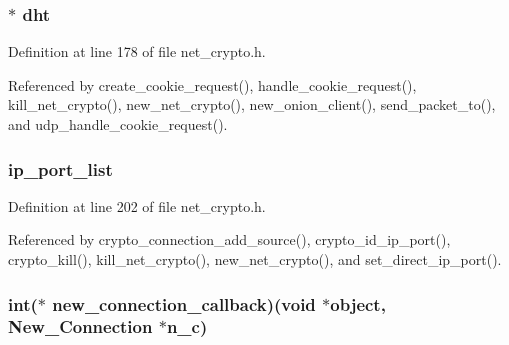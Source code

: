 \hypertarget{struct_net___crypto_a8b3d6ce8745acc52695e252bdb1531b6}{
\subsubsection[{dht}]{$\ast$ dht}}\label{struct_net___crypto_a8b3d6ce8745acc52695e252bdb1531b6}


Definition at line 178 of file net\+\_\+crypto.\+h.



Referenced by create\+\_\+cookie\+\_\+request(), handle\+\_\+cookie\+\_\+request(), kill\+\_\+net\+\_\+crypto(), new\+\_\+net\+\_\+crypto(), new\+\_\+onion\+\_\+client(), send\+\_\+packet\+\_\+to(), and udp\+\_\+handle\+\_\+cookie\+\_\+request().

\hypertarget{struct_net___crypto_ae8cfe94df9c9030bbc525010603450ac}{
\subsubsection[{ip\+\_\+port\+\_\+list}]{ ip\+\_\+port\+\_\+list}}\label{struct_net___crypto_ae8cfe94df9c9030bbc525010603450ac}


Definition at line 202 of file net\+\_\+crypto.\+h.



Referenced by crypto\+\_\+connection\+\_\+add\+\_\+source(), crypto\+\_\+id\+\_\+ip\+\_\+port(), crypto\+\_\+kill(), kill\+\_\+net\+\_\+crypto(), new\+\_\+net\+\_\+crypto(), and set\+\_\+direct\+\_\+ip\+\_\+port().

\hypertarget{struct_net___crypto_a4e2c131b4a4b4ccb2acc140c29c628be}{
\subsubsection[{new\+\_\+connection\+\_\+callback}]{\setlength{\rightskip}{0pt plus 5cm}int($\ast$ new\+\_\+connection\+\_\+callback)(void $\ast$object, {\bf New\+\_\+\+Connection} $\ast$n\+\_\+c)}}\label{struct_net___crypto_a4e2c131b4a4b4ccb2acc140c29c628be}


